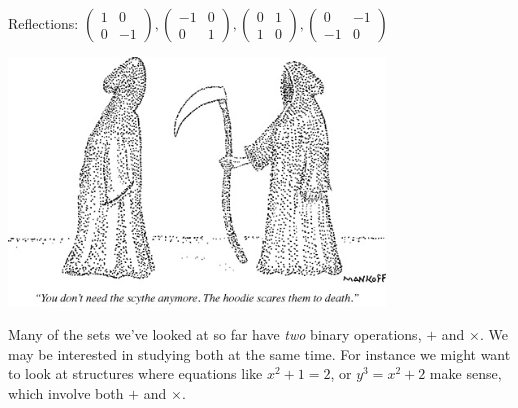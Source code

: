 \documentclass[10pt]{scrartcl}
\begin{document}
\begin{example}
Reflections: $\begin{pmatrix}  %
1 & 0 \\ 0 & -1	\end{pmatrix}
, \begin{pmatrix}  %
-1 & 0 \\ 0& 1	
\end{pmatrix}
, 
\begin{pmatrix}		%
0 & 1 \\ 1 & 0     %
\end{pmatrix}
,
\begin{pmatrix}  %
0 & -1 \\ -1& 0	 %
\end{pmatrix}$
\end{example}


 
 \vspace*{2cm}

\begin{center}
\includegraphics[width = 10cm]{cartoon2.jpg}	
\end{center}


 


 
 

    \setcounter{equation}{128}
    
 Many  
of the sets we've looked at so far have \emph{two} binary operations, $+$ and $\times$. We may be interested in studying both at the same time. For instance we might want to look at structures where equations like $x^2 + 1 = 2$, or $y^3 = x^2 + 2$ make sense, which involve both $+$ and $\times$.\\
 
\end{document}
